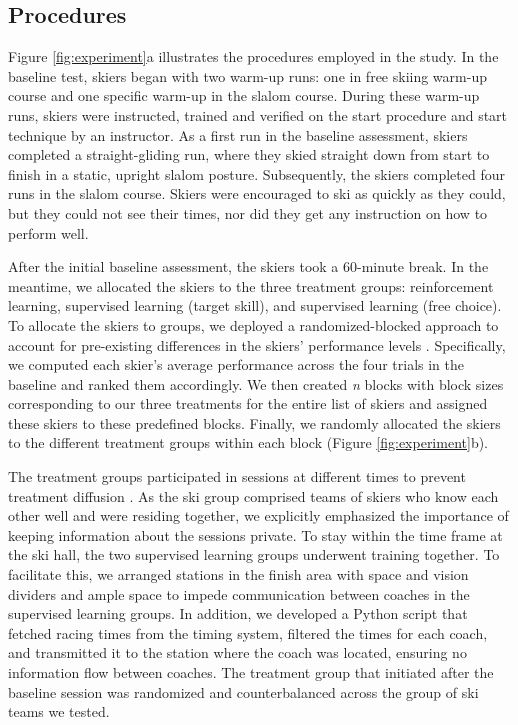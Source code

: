 \documentclass{article}
\begin{document}
\subsection{Procedures}\label{subsec4}
Figure \ref{fig:experiment}a illustrates the procedures employed in the study. 
In the baseline test, skiers began with two warm-up runs: one in free skiing warm-up course and one specific warm-up in the slalom course. During these warm-up runs, skiers were instructed, trained and verified on the start procedure and start technique by an instructor. As a first run in the baseline assessment, skiers completed a straight-gliding run, where they skied straight down from start to finish in a static, upright slalom posture. Subsequently, the skiers completed four runs in the slalom course. Skiers were encouraged to ski as quickly as they could, but they could not see their times, nor did they get any instruction on how to perform well. 

After the initial baseline assessment, the skiers took a 60-minute break. In the meantime, we allocated the skiers to the three treatment groups: reinforcement learning, supervised learning (target skill), and supervised learning (free choice). To allocate the skiers to groups, we deployed a randomized-blocked approach to account for pre-existing differences in the skiers’ performance levels \cite{maxwell_designing_2017}. Specifically, we computed each skier’s average performance across the four trials in the baseline and ranked them accordingly. We then created \textit{n} blocks with block sizes corresponding to our three treatments for the entire list of skiers and assigned these skiers to these predefined blocks. Finally, we randomly allocated the skiers to the different treatment groups within each block (Figure \ref{fig:experiment}b).

The treatment groups participated in sessions at different times to prevent treatment diffusion \cite{maxwell_designing_2017}. As the ski group comprised teams of skiers who know each other well and were residing together, we explicitly emphasized the importance of keeping information about the sessions private. To stay within the time frame at the ski hall, the two supervised learning groups underwent training together. To facilitate this, we arranged stations in the finish area with space and vision dividers and ample space to impede communication between coaches in the supervised learning groups. In addition, we developed a Python script that fetched racing times from the timing system, filtered the times for each coach, and transmitted it to the station where the coach was located, ensuring no information flow between coaches. The treatment group that initiated after the baseline session was randomized and counterbalanced across the group of ski teams we tested.
\end{document}
